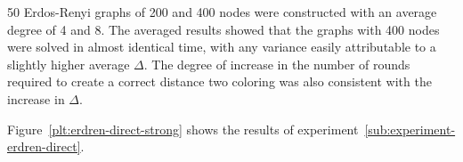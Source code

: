 50 Erdos-Renyi graphs of 200 and 400 nodes were constructed with an average degree of 4 and 8. The averaged results showed that the graphs with 400 nodes were solved in almost identical time, with any variance easily attributable to a slightly higher average $\Delta$. The degree of increase in the number of rounds required to create a correct distance two coloring was also consistent with the increase in $\Delta$. 

Figure~\ref{plt:erdren-direct-strong} shows the results of experiment~\ref{sub:experiment-erdren-direct}.



